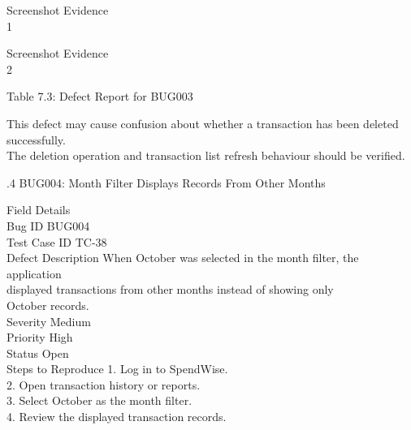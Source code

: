 \documentclass[12pt,a4paper]{report}
\begin{document}
\smallskip

\smallskip

\smallskip

\smallskip
Screenshot Evidence\\ 
1\\ 

\smallskip

\smallskip

\smallskip

\smallskip
Screenshot Evidence\\ 
2\\ 

\smallskip

\smallskip

\smallskip

\smallskip
Table 7.3: Defect Report for BUG003\\ 

\smallskip

\smallskip
This defect may cause confusion about whether a transaction has been deleted successfully.\\ 
The deletion operation and transaction list refresh behaviour should be verified.\\ 

\smallskip

.4 BUG004: Month Filter Displays Records From Other Months\\ 

\smallskip

\smallskip
Field                 Details\\ 
Bug ID                BUG004\\ 
Test Case ID          TC-38\\ 
Defect Description    When October was selected in the month filter, the application\\ 
displayed transactions from other months instead of showing only\\ 
October records.\\ 
Severity              Medium\\ 
Priority              High\\ 
Status                Open\\ 
Steps to Reproduce    1. Log in to SpendWise.\\ 
2. Open transaction history or reports.\\ 
3. Select October as the month filter.\\ 
4. Review the displayed transaction records.\\ 
\end{document}
